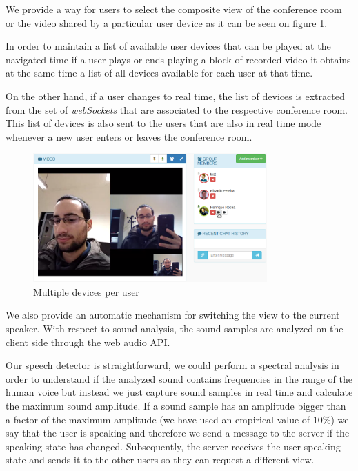 		We provide a way for users to select the composite view of the conference room or the video shared by a particular user device as it can be seen on figure \ref{fig:devices}. 

		In order to maintain a list of available user devices that can be played at the navigated time if a user plays or ends playing a block of recorded video it obtains at the same time a list of all devices available for each user at that time.

		On the other hand, if a user changes to real time, the list of devices is extracted from the set of \emph{webSockets} that are associated to the respective conference room. This list of devices is also sent to the users that are also in real time mode whenever a new user enters or leaves the conference room.

	\begin{figure}[!htb]
		\centering
		\includegraphics[width=0.8\textwidth]{figures/devices.png}
		\caption{Multiple devices per user}
		\label{fig:devices}
	\end{figure}

		We also provide an automatic mechanism for switching the view to the current speaker. With respect to sound analysis, the sound samples are analyzed on the client side through the web audio \ac{API}.

		Our speech detector is straightforward, we could perform a spectral analysis in order to understand if the analyzed sound contains frequencies in the range of the human voice but instead we just capture sound samples in real time and calculate the maximum sound amplitude. If a sound sample has an amplitude bigger than a factor of the maximum amplitude (we have used an empirical value of 10\%) we say that the user is speaking and therefore we send a message to the server if the speaking state has changed. Subsequently, the server receives the user speaking state and sends it to the other users so they can request a different view.



